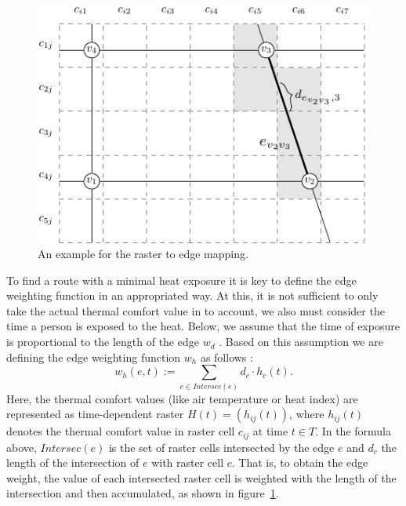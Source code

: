 \begin{figure}
	\centering
	\includegraphics{figures/raster-edge-mapping-standalone}
	\caption[Example for the raster to edge mapping]{An 
		example for the raster to edge mapping.}
	\label{fig:raster-edge-mapping}
\end{figure}

To find a route with a minimal heat exposure it is key to define the edge weighting function in an appropriated way. At this, it is not sufficient to only take the actual thermal comfort value  in to account, we also must consider the time a person is exposed to the heat. Below, we assume that the time of exposure is proportional to the length of the edge $w_d$ \parencite[following][]{Hasenfratz2015}. Based on this assumption we are defining the edge weighting function $w_h$ as follows \parencite[cf.][]{Hasenfratz2015}: 
\begin{equation}\label{eq:edge-weight}
w_h(e, t) := \sum_{c \in Intersec(e)} d_c \cdot h_c(t).
\end{equation}
Here, the thermal comfort values (like air temperature or heat index) are represented as time-dependent raster $H(t) = \left(h_{ij}(t)\right)$, where $h_{ij}(t)$ denotes the thermal comfort value in raster cell $c_{ij}$ at time $t \in T$. In the formula above, $Intersec(e)$ is the set of raster cells intersected by the edge $e$ and $d_c$ the length of the intersection of $e$ with raster cell $c$.  That is, to obtain the edge weight, the value of each intersected raster cell is weighted with the length of the intersection and then accumulated, as shown in figure~\ref{fig:raster-edge-mapping}.

